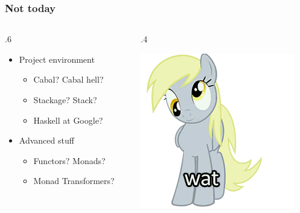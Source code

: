 \documentclass[17pt]{beamer}
\renewcommand{\(}[1]{\begin{columns}[#1]}
\renewcommand{\)}{\end{columns}}
\newcommand{\<}[1]{\begin{column}{#1}}
\renewcommand{\>}{\end{column}}
\begin{document}
\begin{frame}
  \frametitle{Not today}
  \({c}
  \<{.6\textwidth}
  \begin{center}
  \begin{itemize}
  \item Project environment
    \begin{itemize}
    \item Cabal? Cabal hell?
    \item Stackage? Stack?
    \item Haskell at Google?
    \end{itemize}
  \end{itemize}
  \begin{itemize}
  \item Advanced stuff
    \begin{itemize}
    \item Functors? Monads?
    \item Monad Transformers?
    \end{itemize}
  \end{itemize}
  \end{center}
  \>
  \<{.4\textwidth}
  \begin{center}
    \includegraphics[width=.8\textwidth]{img/derpywhat}
  \end{center}
  \>
  \)
\end{frame}
\end{document}
